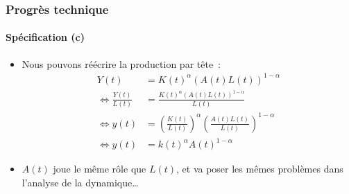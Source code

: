 \documentclass[10pt,notheorems]{beamer}
\theoremstyle{plain}
\theoremstyle{definition} %
\begin{document}
\begin{frame}
  \frametitle{Progrès technique}
  \framesubtitle{Spécification (c)}

  \bigskip

  \begin{itemize}

  \item Nous pouvons réécrire la production par tête~:
    \[
      \begin{split}
        Y(t) &= K(t)^\alpha\left(A(t)L(t)\right)^{1-\alpha}\\
        \Leftrightarrow \frac{Y(t)}{L(t)} &= \frac{K(t)^\alpha\left(A(t)L(t)\right)^{1-\alpha}}{L(t)}\\
        \Leftrightarrow y(t) &= \left(\frac{K(t)}{L(t)}\right)^\alpha\left(\frac{A(t)L(t)}{L(t)}\right)^{1-\alpha}\\
        \Leftrightarrow y(t) &= k(t)^\alpha A(t)^{1-\alpha}
      \end{split}
    \]

    \bigskip

  \item $A(t)$ joue le même rôle que $L(t)$, et va poser les mêmes problèmes dans l'analyse de la dynamique\ldots

  \end{itemize}

\end{frame}
\end{document}
